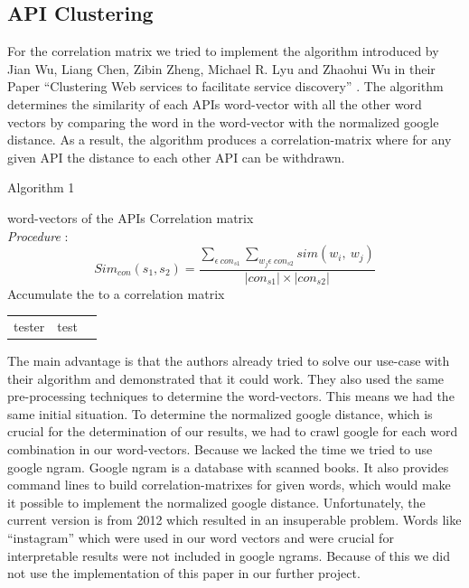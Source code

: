 \documentclass[a4paper]{IEEEtran}
\begin{document}
\subsection{API Clustering}
For the correlation matrix we tried to implement the algorithm introduced by Jian Wu, Liang Chen, Zibin Zheng, Michael R. Lyu and Zhaohui Wu in their Paper “Clustering Web services to facilitate service discovery” \cite{kanungo2002efficient}. The algorithm determines the similarity of each APIs word-vector with all the other word vectors by comparing the word in the word-vector with the normalized google distance. As a result, the algorithm produces a correlation-matrix where for any given API the distance to each other API can be withdrawn.

\begin{algorithm}[H]
 \caption{Algorithm 1}
 \begin{algorithmic}[1]
\renewcommand{\algorithmicrequire}{\textbf{Input:}}
 \renewcommand{\algorithmicensure}{\textbf{Output:}}
 \REQUIRE word-vectors of the APIs
 \ENSURE  Correlation matrix
 \\ \textit{Procedure} :
\STATE \begin{equation*}{Sim}_{con}\left(s_1,s_2\right)=\frac{\sum_{\epsilon\ {con}_{s1}}\sum_{w_j\epsilon\ {con}_{s2}}{sim(w_i,\ w_j)}}{\left|{con}_{s1}\right|\times\left|{con}_{s2}\right|} \end{equation*}
\ENDFOR
\ENDFOR
 \STATE Accumulate the to a correlation matrix
 \end{algorithmic}
 \end{algorithm}

\begin{table}
\begin{tabular}{lll}
\hline
tester & test \\
\end{tabular}
\end{table}

The main advantage is that the authors already tried to solve our use-case with their algorithm and demonstrated that it could work. They also used the same pre-processing techniques to determine the word-vectors. This means we had the same initial situation.
To determine the normalized google distance, which is crucial for the determination of our results, we had to crawl google for each word combination in our word-vectors. Because we lacked the time we tried to use google ngram. Google ngram is a database with scanned books. It also provides command lines to build correlation-matrixes for given words, which would make it possible to implement the normalized google distance. Unfortunately, the current version is from 2012 which resulted in an insuperable problem. Words like “instagram” which were used in our word vectors and were crucial for interpretable results were not included in google ngrams. Because of this we did not use the implementation of this paper in our further project.
\end{document}
